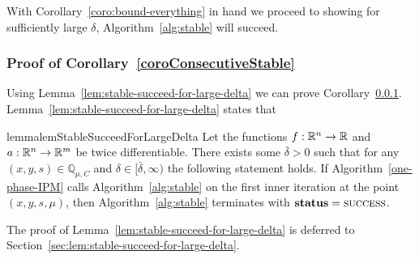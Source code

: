 \documentclass{article}
\begin{document}
With Corollary~\ref{coro:bound-everything} in hand we proceed to showing for sufficiently large $\delta$, Algorithm~\ref{alg:stable} will succeed.


\subsubsection{Proof of Corollary~\ref{coroConsecutiveStable}}\label{sec:coroConsecutiveStable}

Using Lemma~\ref{lem:stable-succeed-for-large-delta} we can prove Corollary~\ref{sec:coroConsecutiveStable}. Lemma~\ref{lem:stable-succeed-for-large-delta} states that

\begin{restatable}{lemma}{lemStableSucceedForLargeDelta} \label{lem:stable-succeed-for-large-delta}
Let the functions $f : \mathbb{R}^{n} \rightarrow \mathbb{R}$ and $a : \mathbb{R}^{n} \rightarrow \mathbb{R}^{m}$ be twice differentiable. There exists some $\bar{\delta} > 0$ such that for any $(x,y,s) \in \mathbb{Q}_{\mu,C}$ and $\delta \in [\bar{\delta}, \infty)$ the following statement holds. If Algorithm~\ref{one-phase-IPM} calls Algorithm~\ref{alg:stable} on the first inner iteration at the point $(x, y, s, \mu)$, then Algorithm~\ref{alg:stable}  terminates with $\textbf{status} = \textsc{success}$.
\end{restatable}

The proof of Lemma~\ref{lem:stable-succeed-for-large-delta} is deferred to Section~\ref{sec:lem:stable-succeed-for-large-delta}.

\coroConsecutiveStable*
\end{document}
